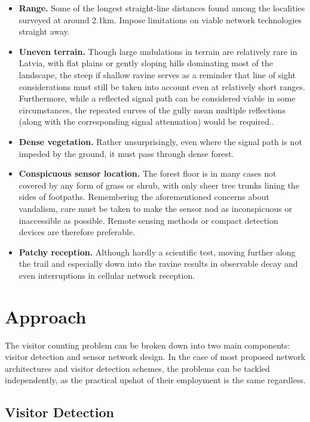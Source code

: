\documentclass[10pt,nocopyrightspace]{ewsn-proc}
\begin{document}
\begin{itemize}
\item \textbf{Range.} Some of the longest straight-line distances found among the localities surveyed at around 2.1km. Impose limitations on viable network technologies straight away. 
\item \textbf{Uneven terrain.} Though large undulations in terrain are relatively rare in Latvia, with flat plains or gently sloping hills dominating most of the landscape, the steep if shallow ravine serves as a reminder that line of sight considerations must still be taken into account even at relatively short ranges. Furthermore, while a reflected signal path can be considered viable in some circumstances, the repeated curves of the gully mean multiple reflections (along with the corresponding signal attenuation) would be required..
\item \textbf{Dense vegetation.} Rather unsurprisingly, even where the signal path is not impeded by the ground, it must pass through dense forest.
\item \textbf{Conspicuous sensor location.} The forest floor is in many cases not covered by any form of grass or shrub, with only sheer tree trunks lining the sides of footpaths. Remembering the aforementioned concerns about vandalism, care must be taken to make the sensor nod as inconspicuous or inaccessible as possible. Remote sensing methods or compact detection devices are therefore preferable.
\item \textbf{Patchy reception.} Although hardly a scientific test, moving further along the trail and especially down into the ravine results in observable decay and even interruptions in cellular network reception.
\end{itemize}

\section{Approach}
The visitor counting problem can be broken down into two main components: visitor detection and sensor network design. In the case of most proposed network architectures and visitor detection schemes, the problems can be tackled independently, as the practical upshot of their employment is the same regardless.

\subsection{Visitor Detection}
\end{document}
